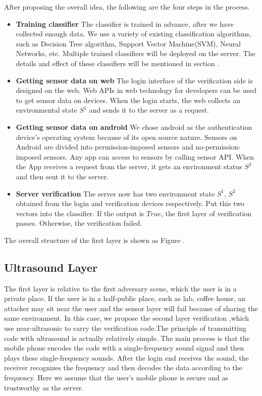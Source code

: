 After proposing the overall idea, the following are the four steps in the process. 

 
\begin{itemize}
  
  \item \textbf{Training classifier} The classifier is trained in advance, after we have collected enough data. We use a variety of existing classification algorithms, such as Decision Tree algorithm, Support Vector Machine(SVM), Neural Networks, etc. Multiple trained classifiers will be deployed on the server. The details and effect of these classifiers will be mentioned in section . 
  
  \item \textbf{Getting sensor data on web} The login interface of the verification side is designed on the web. Web APIs in web technology for developers can be used to get sensor data on devices. When the login starts, the web collects an environmental state $S^1$ and sends it to the server as a request.
  
	\item \textbf{Getting sensor data on android} We chose android as the authentication device's operating system because of its open source nature. Sensors on Android are divided into permission-imposed sensors and no-permission-imposed sensors. Any app can access to sensors by calling sensor API. When the App receives a request from the server, it gets an environment status $S^2$ and then sent it to the server.
	
	\item \textbf{Server verification} The server now has two environment state $S^1$, $S^2$ obtained from the login and verification devices respectively. Put this two vectors into the classifier. If the output is $True$, the first layer of verification passes. Otherwise, the verification failed.
  
\end{itemize}

The overall structure of the first layer is shown as Figure \uppercase\expandafter{}.


\subsection{Ultrasound Layer}

The first layer is relative to the first adversary scene, which the user is in a private place. If the user is in a half-public place, such as lab, coffee house, an attacker may sit near the user and the sensor layer will fail because of sharing the same environment.
In this case, we propose the second layer verification ,which use near-ultrasonic to carry the verification code.The principle of transmitting code with ultrasound is actually relatively simple. The main process is that the mobile phone encodes the code with a single-frequency sound signal and then plays these single-frequency sounds. After the login end receives the sound, the receiver recognizes the frequency and then decodes the data according to the frequency.  Here we assume that the user's mobile phone is secure and as trustworthy as the server.




